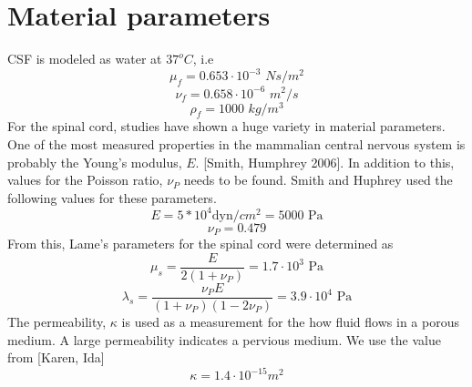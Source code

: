 \chapter{Material parameters}
CSF is modeled as water at $37^o C$, i.e
\[ \mu_f = 0.653\cdot 10^{-3}\,\, Ns/m^2 \]
\[ \nu_f = 0.658\cdot 10^{-6}\,\, m^2/s \]
\[ \rho_f = 1000\,\,kg/m^3 \]
For the spinal cord, studies have shown a huge variety in material parameters. One of the most measured properties in the mammalian central nervous system is probably the Young's modulus, $E$. [Smith, Humphrey 2006]. In addition to this, values for the Poisson ratio, $\nu_P$ needs to be found. Smith and Huphrey used the following values for these parameters. 
\[ E = 5*10^4 \text{dyn}/cm^2  = 5000 \text{ Pa}\]
\[ \nu_P = 0.479 \]
From this, Lame's parameters for the spinal cord were determined as
\[ \mu_s = \frac{E}{2(1 + \nu_P)} = 1.7 \cdot 10^3 \text{ Pa}\]
\[ \lambda_s = \frac{\nu_P E}{(1 + \nu_P)(1-2\nu_P)} = 3.9 \cdot 10^4 \text{ Pa}\]
The permeability, $\kappa$ is used as a measurement for the how fluid flows in a porous medium. A large permeability indicates a pervious medium. We use the value from [Karen, Ida]
\[ \kappa = 1.4\cdot 10^{-15} m^2 \]
